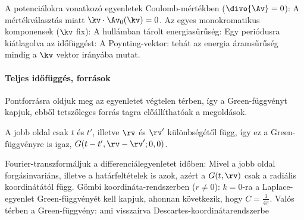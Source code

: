     A potenciálokra vonatkozó egyenletek Coulomb-mértékben ($\divo{\Av}=0$):
    A mértékválasztás miatt $\kv\cdot\Av_0(\kv)=0$.
   Az egyes monokromatikus komponensek ($\kv$ fix):
    A hullámban tárolt energiasűrűség:
    Egy periódusra kiátlagolva az időfüggést:
    A Poynting-vektor:
    tehát az energia áramsűrűség mindig a $\kv$ vektor irányába mutat. 
    
   \paragraph{Teljes időfüggés, források}
    
    Pontforrásra oldjuk meg az egyenletet végtelen térben, így a Green-függvényt kapjuk, ebből tetszőleges forrás tagra előállíthatóak a megoldások.
    
    A jobb oldal csak $t$ és $t'$, illetve $\rv$ és $\rv'$ különbségétől függ, így ez a Green-függvényre is igaz, $G(t-t',\rv-\rv';0,0)$.
    
    Fourier-transzformáljuk a differenciálegyenletet időben:
    Mivel a jobb oldal forgásinvariáns, illetve a határfeltételek is azok, azért a $G(t,\rv)$ csak a radiális koordinátától függ.
   Gömbi koordináta-rendszerben ($r\ne0$):
    $k=0$-ra a Laplace-egyenlet Green-függvényét kell kapjuk, ahonnan következik, hogy $C=\frac{1}{4\pi}$.
   Valós térben a Green-függvény:
    ami visszaírva Descartes-koordinátarendszerbe


